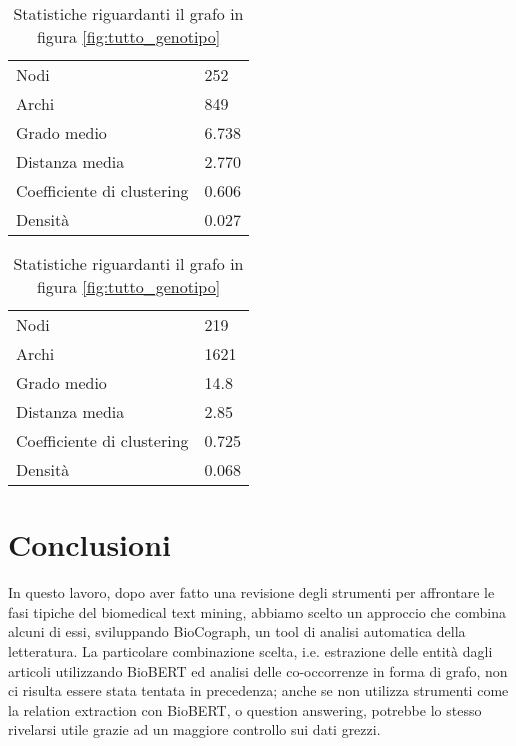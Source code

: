 \documentclass[12pt]{report}
\begin{document}
\begin{table}[htb]
\parbox{.45\linewidth}{
\centering
    \begin{tabular}{|l|l|}
    \hline
    \small{Nodi} & \small{252}	\\
    \small{Archi} &	\small{849}\\
    \small{Grado medio} & \small{6.738} 	\\
    \small{Distanza media} & \small{2.770}	\\
    \small{Coefficiente di clustering} & \small{0.606}	\\
    \small{Densità} &	\small{0.027}\\
    \hline
    \end{tabular}
    \caption{\footnotesize{Statistiche riguardanti il grafo in figura \ref{fig:tutto_fenotipo}}}
    \label{tab:tutto_fenotipo_stat}
}
\hfill
\parbox{.45\linewidth}{
\centering
    \begin{tabular}{|l|l|}
    \hline
    \small{Nodi} & \small{219}	\\
    \small{Archi} &	\small{1621}\\
    \small{Grado medio} & \small{14.8} 	\\
    \small{Distanza media} & \small{2.85}	\\
    \small{Coefficiente di clustering} & \small{0.725}	\\
    \small{Densità} &	\small{0.068}\\
    \hline
    \end{tabular}
    \caption{\footnotesize{Statistiche riguardanti il grafo in figura \ref{fig:tutto_genotipo}}}
    \label{tab:tutto_genotipo_stat}
}
\end{table}


\chapter{Conclusioni}

In questo lavoro, dopo aver fatto una revisione degli strumenti per affrontare le fasi tipiche del biomedical text mining, abbiamo scelto un approccio che combina alcuni di essi, sviluppando BioCograph, un tool di analisi automatica della letteratura. La particolare combinazione scelta, i.e. estrazione delle entità dagli articoli utilizzando BioBERT ed analisi delle co-occorrenze in forma di grafo, non ci risulta essere stata tentata in precedenza; anche se non utilizza strumenti come la relation extraction con BioBERT, o question answering, potrebbe lo stesso rivelarsi utile grazie ad un maggiore controllo sui dati grezzi.
\end{document}
